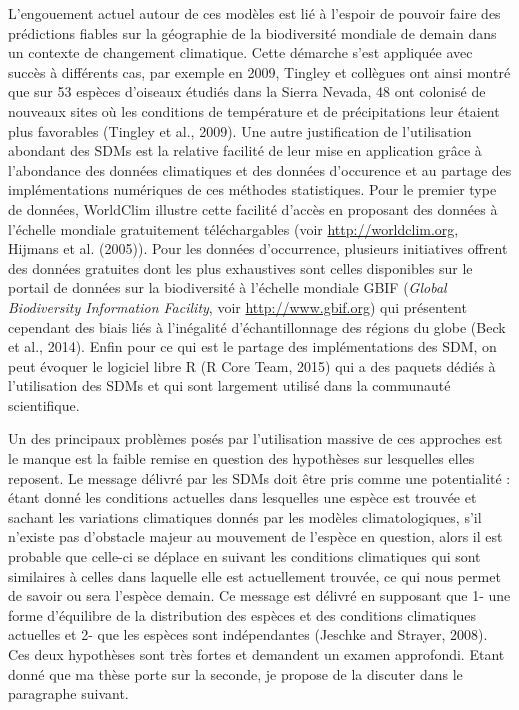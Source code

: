L'engouement actuel autour de ces modèles est lié à l'espoir de pouvoir
faire des prédictions fiables sur la géographie de la biodiversité
mondiale de demain dans un contexte de changement climatique. Cette
démarche s'est appliquée avec succès à différents cas, par exemple en
2009, Tingley et collègues ont ainsi montré que sur 53 espèces d'oiseaux
étudiés dans la Sierra Nevada, 48 ont colonisé de nouveaux sites où les
conditions de température et de précipitations leur étaient plus
favorables (Tingley et al., 2009). Une autre justification de
l'utilisation abondant des SDMs est la relative facilité de leur mise en
application grâce à l'abondance des données climatiques et des données
d'occurence et au partage des implémentations numériques de ces méthodes
statistiques. Pour le premier type de données, WorldClim illustre cette
facilité d'accès en proposant des données à l'échelle mondiale
gratuitement téléchargables (voir \url{http://worldclim.org}, Hijmans et
al. (2005)). Pour les données d'occurrence, plusieurs initiatives
offrent des données gratuites dont les plus exhaustives sont celles
disponibles sur le portail de données sur la biodiversité à l'échelle
mondiale GBIF (\emph{Global Biodiversity Information Facility}, voir
\url{http://www.gbif.org}) qui présentent cependant des biais liés à
l'inégalité d'échantillonnage des régions du globe (Beck et al., 2014).
Enfin pour ce qui est le partage des implémentations des SDM, on peut
évoquer le logiciel libre R (R Core Team, 2015) qui a des paquets dédiés
à l'utilisation des SDMs et qui sont largement utilisé dans la
communauté scientifique.

Un des principaux problèmes posés par l'utilisation massive de ces
approches est le manque est la faible remise en question des hypothèses
sur lesquelles elles reposent. Le message délivré par les SDMs doit être
pris comme une potentialité : étant donné les conditions actuelles dans
lesquelles une espèce est trouvée et sachant les variations climatiques
donnés par les modèles climatologiques, s'il n'existe pas d'obstacle
majeur au mouvement de l'espèce en question, alors il est probable que
celle-ci se déplace en suivant les conditions climatiques qui sont
similaires à celles dans laquelle elle est actuellement trouvée, ce qui
nous permet de savoir ou sera l'espèce demain. Ce message est délivré en
supposant que 1- une forme d'équilibre de la distribution des espèces et
des conditions climatiques actuelles et 2- que les espèces sont
indépendantes (Jeschke and Strayer, 2008). Ces deux hypothèses sont très
fortes et demandent un examen approfondi. Etant donné que ma thèse porte
sur la seconde, je propose de la discuter dans le paragraphe suivant.

